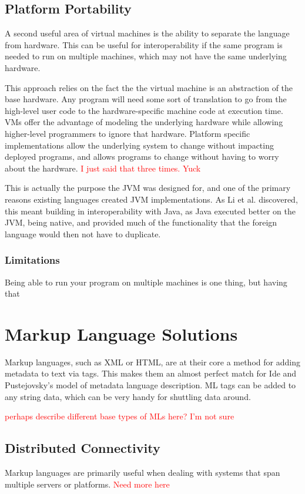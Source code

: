\documentclass{sig-alternate}
\newcommand{\mycomment}[1]{\textcolor{red}{#1}}
\begin{document}
\subsection*{Platform Portability}
A second useful area of virtual machines is the ability to separate the language from hardware. This can be useful for interoperability if the same program is needed to run on multiple machines, which may not have the same underlying hardware.

This approach relies on the fact the the virtual machine is an abstraction of the base hardware. Any program will need some sort of translation to go from the high-level user code to the hardware-specific machine code at execution time. VMs offer the advantage of modeling the underlying hardware while allowing higher-level programmers to ignore that hardware. Platform specific implementations allow the underlying system to change without impacting deployed programs, and allows programs to change without having to worry about the hardware. \mycomment{I just said that three times. Yuck}

This is actually the purpose the JVM was designed for, and one of the primary reasons existing languages created JVM implementations. As Li et al. discovered, this meant building in interoperability with Java, as Java executed better on the JVM, being native, and provided much of the functionality that the foreign language would then not have to duplicate\cite{Li:2013}.

\subsubsection{Limitations}
Being able to run your program on multiple machines is one thing, but having that 


\section{Markup Language Solutions}\label{ML}
Markup languages, such as XML or HTML, are at their core a method for adding metadata to text via tags. This makes them an almost perfect match for Ide and Pustejovsky's model of metadata language description. ML tags can be added to any string data, which can be very handy for shuttling data around.

\mycomment{perhaps describe different base types of MLs here? I'm not sure}

\subsection*{Distributed Connectivity}
Markup languages are primarily useful when dealing with systems that span multiple servers or platforms. \mycomment{Need more here}
\end{document}
